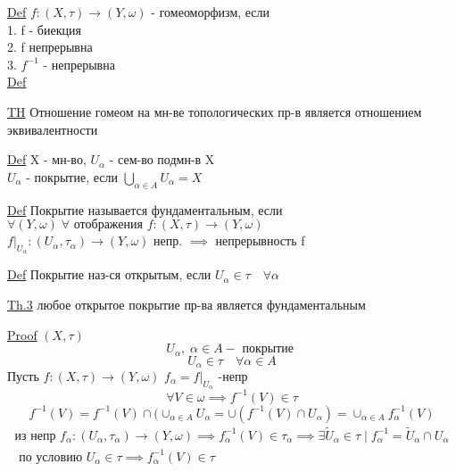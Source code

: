 \documentclass[a4paper]{article}
\begin{document}
\underline{Def} $ f: (X, \tau) \to (Y, \omega)$ - гомеоморфизм, если\\
1. f - биекция \\
2. f непрерывна \\
3. $ f^{-1} $ - непрерывна\\
\underline{Def} 

\begin{tcolorbox}
    \underline{TH} Отношение гомеом на мн-ве топологических пр-в является отношением
    эквивалентности \\
\end{tcolorbox}

\underline{Def} X - мн-во, $ U_{\alpha} $ - сем-во подмн-в X \\
$ U_{\alpha} $ - покрытие, если $ \bigcup_{\alpha \in A} U_{\alpha}  = X $

\underline{Def}  Покрытие называется фундаментальным, если $ \forall (Y, \omega)
\; \forall \text{ отображения } f: (X, \tau) \to (Y, \omega) $ \\
$ f |_{U_{\alpha}}: (U_{\alpha}, \tau_{\alpha}) \to (Y, \omega) \text{ непр. }
\implies $ непрерывность f

\begin{tcolorbox}
    \underline{Def} Покрытие наз-ся открытым, если $ U_{\alpha} \in \tau \quad 
    \forall \alpha $ 

    \underline{Th.3} любое открытое покрытие пр-ва является фундаментальным

    \underline{Proof} $ (X, \tau) $ \\
\[
    U_{\alpha}, \; \alpha \in A - \text{ покрытие }
\]
\[
    U_{\alpha} \in \tau \quad \forall \alpha \in A
\]
Пусть $ f: (X, \tau)\to (Y, \omega)  $ $ f_{\alpha} = f |_{U_{\alpha}} $ -непр\\
\[
    \forall V \in \omega \implies f^{-1}(V) \in \tau
\]
\[
    f^{-1}(V) = f^{-1}(V) \cap (\cup_{\alpha \in A} U_{\alpha} = 
    \cup (f^{-1}(V) \cap U_{\alpha})= \cup_{\alpha \in A} f_{\alpha}^{-1}(V)
\]
\begin{equation*}
    \begin{aligned}
        \text{из непр } f_{\alpha}: (U_{\alpha}, \tau_{\alpha}) \to (Y, \omega) \implies
        f^{-1}_{\alpha}(V) \in \tau_{\alpha} \implies \exists \tilde{U}_{\alpha} 
        \in \tau \; | \; f_{\alpha}^{-1} = \tilde{U}_{\alpha} \cap U_{\alpha}\\
        \text{ по условию } U_{\alpha} \in \tau \implies f_{\alpha}^{-1}(V) \in \tau
    \end{aligned}
\end{equation*}
\end{tcolorbox}
\end{document}

